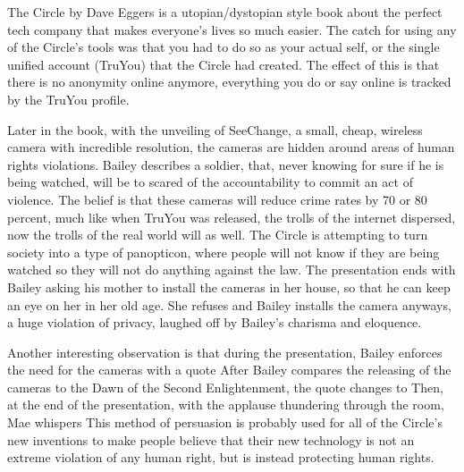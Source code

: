 The Circle by Dave Eggers is a utopian/dystopian style book about the perfect tech company that makes everyone's lives so much easier.
The catch for using any of the Circle's tools was that you had to do so as your actual self, or the single unified account (TruYou) that the Circle had created.
The effect of this is that there is no anonymity online anymore, everything you do or say online is tracked by the TruYou profile.
 \autocite[16]{eggers1}

Later in the book, with the unveiling of SeeChange, a small, cheap,  wireless camera with incredible resolution, the cameras are hidden around areas of human rights violations.
Bailey describes a soldier, that, never knowing for sure if he is being watched, will be to scared of the accountability to commit an act of violence.
 \autocite[40]{eggers1}
The belief is that these cameras will reduce crime rates by 70 or 80 percent, much like when TruYou was released, the trolls of the internet dispersed, now the trolls of the real world will as well.
The Circle is attempting to turn society into a type of panopticon, where people will not know if they are being watched so they will not do anything against the law.
The presentation ends with Bailey asking his mother to install the cameras in her house, so that he can keep an eye on her in her old age.
She refuses and Bailey installs the camera anyways, a huge violation of privacy, laughed off by Bailey's charisma and eloquence.

Another interesting observation is that during the presentation, Bailey enforces the need for the cameras with a quote 
After Bailey compares the releasing of the cameras to the Dawn of the Second Enlightenment, the quote changes to 
Then, at the end of the presentation, with the applause thundering through the room, Mae whispers  \autocite[42]{eggers1}
This method of persuasion is probably used for all of the Circle's new inventions to make people believe that their new technology is not an extreme violation of any human right, but is instead protecting human rights.